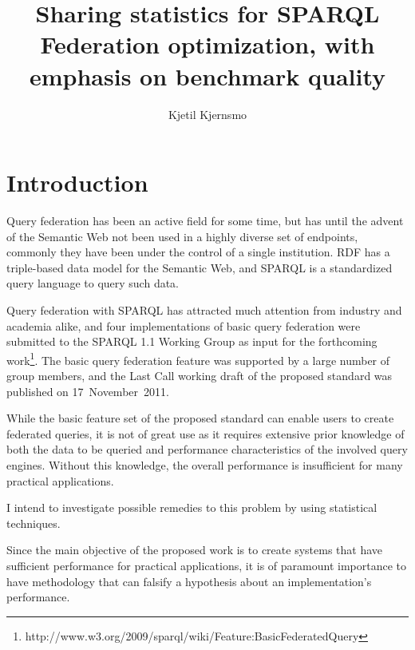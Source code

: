 \documentclass{llncs}
\begin{document}
\title{Sharing statistics for SPARQL Federation optimization, with
  emphasis on benchmark quality}
\author{Kjetil Kjernsmo}



\maketitle


\begin{abstract}


\end{abstract}

\section{Introduction}

Query federation has been an active field for some time, but has until
the advent of the Semantic Web not been used in a highly diverse set
of endpoints, commonly they have been under the control of a single
institution. RDF has a triple-based data model for the Semantic Web,
and SPARQL is a standardized query language to query such data.

Query federation with SPARQL has attracted much attention
from industry and academia alike, and four implementations of basic
query federation were submitted to the SPARQL 1.1 Working Group as
input for the forthcoming
work\footnote{http://www.w3.org/2009/sparql/wiki/Feature:BasicFederatedQuery}. 
The basic query federation feature was
supported by a large number of group members, and the Last Call working
draft of the proposed standard was published on 17~November~2011.

While the basic feature set of the proposed standard can enable users
to create federated queries, it is not of great use as it requires
extensive prior knowledge of both the data to be queried and
performance characteristics of the involved query engines. Without
this knowledge, the overall performance is insufficient for many
practical applications.

I intend to investigate possible remedies to this problem by using
statistical techniques. 

Since the main objective of the proposed work is to create systems
that have sufficient performance for practical applications, it is of
paramount importance to have methodology that can falsify a
hypothesis about an implementation's performance.
\end{document}
